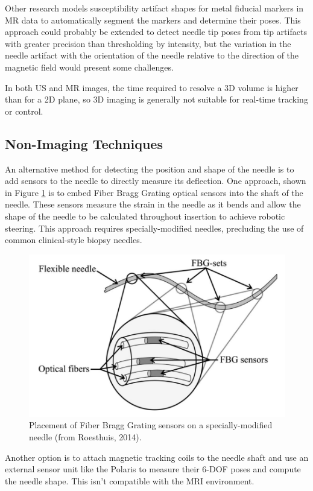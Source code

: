 Other research models susceptibility artifact shapes for metal fiducial markers in MR data to automatically segment the markers and determine their poses\cite{zijlstra_fast_2017}. This approach could probably be extended to detect needle tip poses from tip artifacts with greater precision than thresholding by intensity, but the variation in the needle artifact with the orientation of the needle relative to the direction of the magnetic field would present some challenges.

In both US and MR images, the time required to resolve a 3D volume is higher than for a 2D plane, so 3D imaging is generally not suitable for real-time tracking or control.

\subsection{Non-Imaging Techniques}
An alternative method for detecting the position and shape of the needle is to add sensors to the needle to directly measure its deflection. One approach, shown in Figure \ref{fig:needle_fbg} is to embed Fiber Bragg Grating optical sensors into the shaft of the needle\cite{roesthuis_three-dimensional_2014}. These sensors measure the strain in the needle as it bends and allow the shape of the needle to be calculated throughout insertion to achieve robotic steering. This approach requires specially-modified needles, precluding the use of common clinical-style biopsy needles.

\begin{figure}[h]
\includegraphics[width=1.0\textwidth]{Fig/chap2/fbg_needle.png}
\caption{Placement of Fiber Bragg Grating sensors on a specially-modified needle (from Roesthuis, 2014\cite{roesthuis_three-dimensional_2014}).}
\label{fig:needle_fbg}
\end{figure}

Another option is to attach magnetic tracking coils to the needle shaft and use an external sensor unit like the Polaris to measure their 6-DOF poses and compute the needle shape.
\cite{patil_needle_2014,wang_real-time_2015} This isn’t compatible with the MRI environment.

